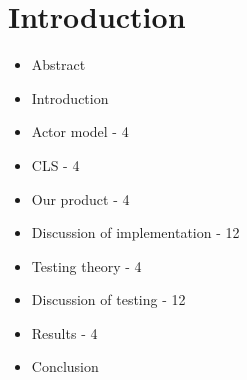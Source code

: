 \section{Introduction}
\begin{itemize}
	\item Abstract
	\item Introduction
	\item Actor model - 4
	\item CLS - 4
	\item Our product - 4
	\item Discussion of implementation - 12
	\item Testing theory - 4
	\item Discussion of testing - 12
	\item Results - 4
	\item Conclusion
\end{itemize}